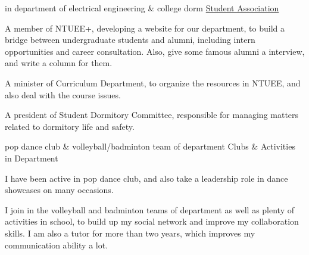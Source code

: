 
\begin{cventries}
  \cventry
    {in department of electrical engineering \& college dorm} %
    {\href{https://eeplus.ntuee.org/home}{Student Association}} %
    {} %
    {} %
    {
      \begin{cvitems} %
        \item {A member of NTUEE+, developing a website for our department, to build a bridge between undergraduate students and alumni, including intern opportunities and career consultation. Also, give some famous alumni a interview, and write a column for them.}
		\item {A minister of Curriculum Department, to organize the resources in NTUEE, and also deal with the course issues.}
		\item {A president of Student Dormitory Committee, responsible for managing matters related to dormitory life and safety.}
      \end{cvitems}
    }

  \cventry
    {pop dance club \& volleyball/badminton team of department} %
    {Clubs \& Activities in Department} %
    {} %
    {} %
    {
      \begin{cvitems} %
      	\item {I have been active in pop dance club, and also take a leadership role in dance showcases on many occasions.}
		\item {I join in the volleyball and badminton teams of department as well as plenty of activities in school, to build up my social network and improve my collaboration skills. I am also a tutor for more than two years, which improves my communication ability a lot.}
      \end{cvitems}
    }
\end{cventries}